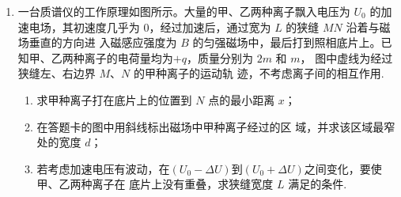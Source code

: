 \begin{enumerate}



\item 
{}
一台质谱仪的工作原理如图所示。大量的甲、乙两种离子飘入电压为
$ U_{0} $ 的加速电场，其初速度几乎为 $ 0 $，经过加速后，通过宽为 $ L $ 的狭缝 $ MN $ 沿着与磁场垂直的方向进
入磁感应强度为 $ B $ 的匀强磁场中，最后打到照相底片上。已
知甲、乙两种离子的电荷量均为$ +q $，质量分别为 $ 2m $ 和 $ m $，
图中虚线为经过狭缝左、右边界 $ M $、$ N $ 的甲种离子的运动轨
迹，不考虑离子间的相互作用.
\begin{enumerate}
	\item
求甲种离子打在底片上的位置到 $ N $ 点的最小距离 $ x $；

\item 
在答题卡的图中用斜线标出磁场中甲种离子经过的区
域，并求该区域最窄处的宽度 $ d $；

\item 
若考虑加速电压有波动，在$\left(U_{0}-\Delta U\right)$到$\left(U_{0}+\Delta U\right)$之间变化，要使甲、乙两种离子在
底片上没有重叠，求狭缝宽度 $ L $ 满足的条件.

	
\end{enumerate}
\begin{figure}[h!]
	\flushright
	
\end{figure}


\end{enumerate}
